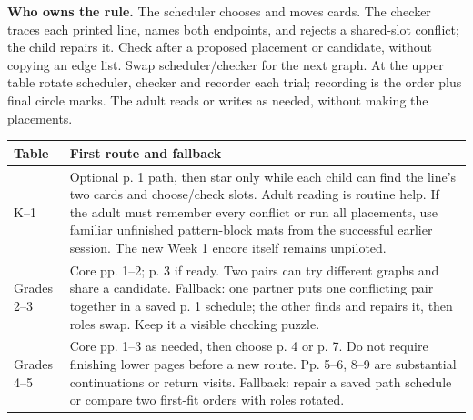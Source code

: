 \documentclass[10pt,letterpaper]{article}
\newcommand{\labelled}[2]{\textbf{#1} #2\par}
\begin{document}
\begin{center}
\end{center}
\labelled{Who owns the rule.}{The scheduler chooses and moves cards. The checker traces each printed line, names both endpoints, and rejects a shared-slot conflict; the child repairs it. Check after a proposed placement or candidate, without copying an edge list. Swap scheduler/checker for the next graph. At the upper table rotate scheduler, checker and recorder each trial; recording is the order plus final circle marks. The adult reads or writes as needed, without making the placements.}
\begin{tabularx}{\linewidth}{@{}p{1.05in}X@{}}
\toprule
Table & First route and fallback \\
\midrule
K--1 & Optional p. 1 path, then star only while each child can find the line's two cards and choose/check slots. Adult reading is routine help. If the adult must remember every conflict or run all placements, use familiar unfinished pattern-block mats from the successful earlier session. The new Week 1 encore itself remains unpiloted. \\
Grades 2--3 & Core pp. 1--2; p. 3 if ready. Two pairs can try different graphs and share a candidate. Fallback: one partner puts one conflicting pair together in a saved p. 1 schedule; the other finds and repairs it, then roles swap. Keep it a visible checking puzzle. \\
Grades 4--5 & Core pp. 1--3 as needed, then choose p. 4 or p. 7. Do not require finishing lower pages before a new route. Pp. 5--6, 8--9 are substantial continuations or return visits. Fallback: repair a saved path schedule or compare two first-fit orders with roles rotated. \\
\bottomrule
\end{tabularx}\par\smallskip
\end{document}
